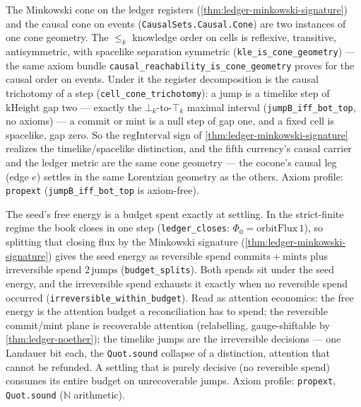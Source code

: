 \begin{theorem}\label{thm:ledger-cone-is-causal-cone}\leanok{}
The Minkowski cone on the ledger registers
(\cref{thm:ledger-minkowski-signature}) and the causal cone on events
(\texttt{CausalSets.Causal.Cone}) are two instances of one cone geometry. The
\(\le_k\) knowledge order on cells is reflexive, transitive, antisymmetric, with
spacelike separation symmetric (\texttt{kle\_is\_cone\_geometry}) --- the same
axiom bundle \texttt{causal\_reachability\_is\_cone\_geometry} proves for the
causal order on events. Under it the register decomposition is the causal
trichotomy of a step (\texttt{cell\_cone\_trichotomy}): a jump is a timelike step
of \(\mathrm{kHeight}\) gap two --- exactly the \(\bot_k\)-to-\(\top_k\) maximal
interval (\texttt{jumpB\_iff\_bot\_top}, no axioms) --- a commit or mint is a null
step of gap one, and a fixed cell is spacelike, gap zero. So the \(\mathrm{regInterval}\)
sign of \cref{thm:ledger-minkowski-signature} realizes the timelike/spacelike
distinction, and the fifth currency's causal carrier and the ledger metric are the
same cone geometry --- the cocone's causal leg (edge \(e\)) settles in the same
Lorentzian geometry as the others. Axiom profile: \texttt{propext}
(\texttt{jumpB\_iff\_bot\_top} is axiom-free).
\end{theorem}

\begin{theorem}\label{thm:budget-split}\leanok{}
The seed's free energy is a budget spent exactly at settling. In the
strict-finite regime the book closes in one step
(\texttt{ledger\_closes}: \(\Phi_0 = \mathrm{orbitFlux}\,1\)), so splitting that
closing flux by the Minkowski signature (\cref{thm:ledger-minkowski-signature})
gives the seed energy as reversible spend \(\mathrm{commits} + \mathrm{mints}\)
plus irreversible spend \(2\,\mathrm{jumps}\) (\texttt{budget\_splits}). Both
spends sit under the seed energy, and the irreversible spend exhausts it exactly
when no reversible spend occurred (\texttt{irreversible\_within\_budget}). Read as
attention economics: the free energy is the attention budget a reconciliation has
to spend; the reversible commit/mint plane is recoverable attention (relabelling,
gauge-shiftable by \cref{thm:ledger-noether}); the timelike jumps are the
irreversible decisions --- one Landauer bit each, the \texttt{Quot.sound} collapse
of a distinction, attention that cannot be refunded. A settling that is purely
decisive (no reversible spend) consumes its entire budget on unrecoverable jumps.
Axiom profile: \texttt{propext}, \texttt{Quot.sound} (\(\mathbb N\) arithmetic).
\end{theorem}

